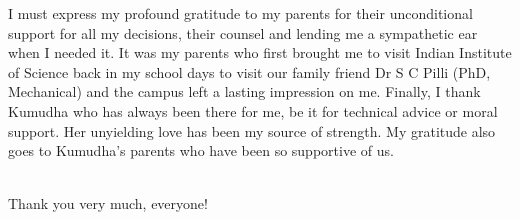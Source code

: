 \par I must express my profound gratitude to my parents for their unconditional support for all my decisions, their counsel and lending me a sympathetic ear when I needed it. It was my parents who first brought me to visit Indian Institute of Science back in my school days to visit our family friend Dr S C Pilli (PhD, Mechanical) and the campus left a lasting impression on me. Finally, I thank Kumudha who has always been there for me, be it for technical advice or moral support. Her unyielding love has been my source of strength. My gratitude also goes to Kumudha's parents who have been so supportive of us.\\
\\
\par Thank you very much, everyone!